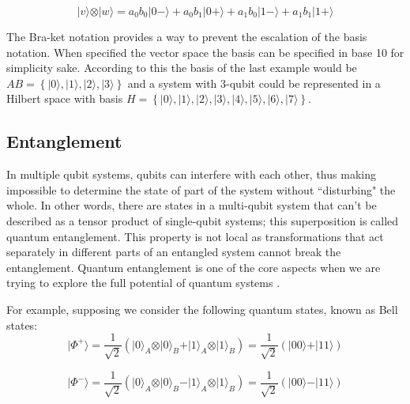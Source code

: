 \begin{equation}
\label{eq:qc_cs_vwsupahspace2}
\vert v \rangle \otimes \vert w \rangle = a_{0}b_{0}\vert 0  - \rangle + a_{0}b_{1}\vert 0 + \rangle + a_{1}b_{0}\vert 1 - \rangle +  a_{1}b_{1}\vert 1 + \rangle 
\end{equation}

The Bra-ket notation provides a way to prevent the escalation of the basis notation. When specified the vector space the basis can be specified in base 10 for simplicity sake. According to this the basis of the last example would be $AB = \left\{ \vert 0 \rangle, \vert 1 \rangle, \vert 2 \rangle,  \vert 3 \rangle \right\}$ and a system with $3$-qubit could be represented in a Hilbert space with basis $H= \left\{ \vert 0 \rangle, \vert 1 \rangle, \vert 2 \rangle,  \vert 3 \rangle,  \vert 4 \rangle,  \vert 5 \rangle,  \vert 6 \rangle,  \vert 7 \rangle \right\}$.



\subsection{Entanglement}
\label{subsec:entanglement}

In multiple qubit systems, qubits can interfere with each other, thus making impossible to determine the state of part of the system without ``disturbing" the whole. In other words, there are states in a multi-qubit system that can't be described as a tensor product of single-qubit systems; this superposition is called quantum entanglement. This property is not local as transformations that act separately in different parts of an entangled system cannot break the entanglement. Quantum entanglement is one of the core aspects when we are trying to explore the full potential of quantum systems \cite{Rieffel2011}.

For example, supposing we consider the following quantum states, known as Bell states:
\begin{equation}
\vert\Phi^{+}\rangle=\frac{1}{\sqrt{2}}(\vert0\rangle_{A} \otimes\vert0\rangle_{B} +\vert1\rangle_{A} \otimes\vert1\rangle_{B})=\frac{1}{\sqrt{2}}(\vert00\rangle+\vert11\rangle)
\end{equation}

\begin{equation}
\vert\Phi^{-}\rangle=\frac{1}{\sqrt{2}}(\vert0\rangle_{A} \otimes\vert0\rangle_{B} -\vert1\rangle_{A} \otimes\vert1\rangle_{B})=\frac{1}{\sqrt{2}}(\vert00\rangle-\vert11\rangle)
\end{equation}

